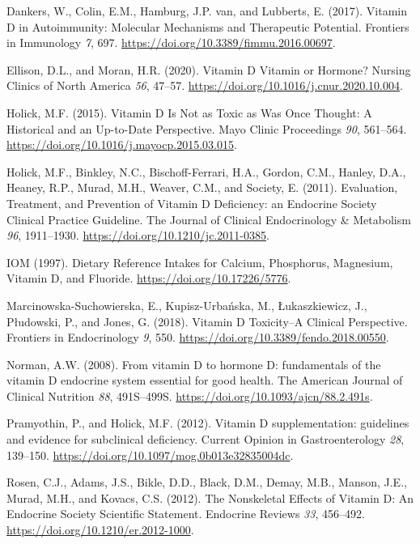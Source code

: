 \documentclass[
  letterpaper,
  DIV=11,
  numbers=noendperiod]{scrartcl}
\newlength{\cslhangindent}
\newlength{\cslentryspacingunit} %
\newenvironment{CSLReferences}[2] %
 {%
  \setlength{\parindent}{0pt}
  \ifodd #1
  \let\oldpar\par
  \def\par{\hangindent=\cslhangindent\oldpar}
  \fi
  \setlength{\parskip}{#2\cslentryspacingunit}
 }%
 {}
\begin{document}
\begin{CSLReferences}{0}{0}
\leavevmode{}%
Dankers, W., Colin, E.M., Hamburg, J.P. van, and Lubberts, E. (2017).
{Vitamin D in Autoimmunity: Molecular Mechanisms and Therapeutic
Potential}. Frontiers in Immunology \emph{7}, 697.
\url{https://doi.org/10.3389/fimmu.2016.00697}.

\leavevmode{}%
Ellison, D.L., and Moran, H.R. (2020). {Vitamin D Vitamin or Hormone?}
Nursing Clinics of North America \emph{56}, 47--57.
\url{https://doi.org/10.1016/j.cnur.2020.10.004}.

\leavevmode{}%
Holick, M.F. (2015). {Vitamin D Is Not as Toxic as Was Once Thought: A
Historical and an Up-to-Date Perspective}. Mayo Clinic Proceedings
\emph{90}, 561--564. \url{https://doi.org/10.1016/j.mayocp.2015.03.015}.

\leavevmode{}%
Holick, M.F., Binkley, N.C., Bischoff-Ferrari, H.A., Gordon, C.M.,
Hanley, D.A., Heaney, R.P., Murad, M.H., Weaver, C.M., and Society, E.
(2011). {Evaluation, Treatment, and Prevention of Vitamin D Deficiency:
an Endocrine Society Clinical Practice Guideline}. The Journal of
Clinical Endocrinology \& Metabolism \emph{96}, 1911--1930.
\url{https://doi.org/10.1210/jc.2011-0385}.

\leavevmode{}%
IOM (1997). {Dietary Reference Intakes for Calcium, Phosphorus,
Magnesium, Vitamin D, and Fluoride}.
\url{https://doi.org/10.17226/5776}.

\leavevmode{}%
Marcinowska-Suchowierska, E., Kupisz-Urbańska, M., Łukaszkiewicz, J.,
Płudowski, P., and Jones, G. (2018). {Vitamin D Toxicity--A Clinical
Perspective}. Frontiers in Endocrinology \emph{9}, 550.
\url{https://doi.org/10.3389/fendo.2018.00550}.

\leavevmode{}%
Norman, A.W. (2008). {From vitamin D to hormone D: fundamentals of the
vitamin D endocrine system essential for good health}. The American
Journal of Clinical Nutrition \emph{88}, 491S--499S.
\url{https://doi.org/10.1093/ajcn/88.2.491s}.

\leavevmode{}%
Pramyothin, P., and Holick, M.F. (2012). {Vitamin D supplementation:
guidelines and evidence for subclinical deficiency}. Current Opinion in
Gastroenterology \emph{28}, 139--150.
\url{https://doi.org/10.1097/mog.0b013e32835004dc}.

\leavevmode{}%
Rosen, C.J., Adams, J.S., Bikle, D.D., Black, D.M., Demay, M.B., Manson,
J.E., Murad, M.H., and Kovacs, C.S. (2012). {The Nonskeletal Effects of
Vitamin D: An Endocrine Society Scientific Statement}. Endocrine Reviews
\emph{33}, 456--492. \url{https://doi.org/10.1210/er.2012-1000}.

\end{CSLReferences}
\end{document}

